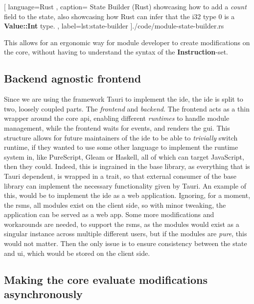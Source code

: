 \begin{center}
  
   [ language=Rust
   , caption={
     State Builder (Rust) showcasing how to add a \textit{count} field to the
     state, also showcasing how Rust can infer that the i32 type $0$ is
     a \textbf{Value::Int} type.
   }
   , label=lst:state-builder
   ]{./code/module-state-builder.rs}
\end{center}

This allows for an ergonomic way for module developer to create modifications on
the core, without having to understand the syntax of the
\textbf{Instruction}-set.


\subsection{Backend agnostic frontend}

Since we are using the framework Tauri to implement the \gls*{ide}, the \gls*{ide}
is split to two, loosely coupled parts. The \textit{frontend} and
\textit{backend}. The frontend acts as a thin wrapper around the core \gls*{api},
enabling different \textit{runtimes} to handle module management, while the
frontend waits for events, and renders the \gls*{gui}. This structure allows for
future maintainers of the \gls*{ide} to be able to \textit{trivially} switch
runtime, if they wanted to use some other language to implement the runtime
system in, like PureScript, Gleam or Haskell, all of which can target
JavaScript, then they could. Indeed, this is ingrained in the base library, as
everything that is Tauri dependent, is wrapped in a trait, so that external
consumer of the base library can implement the necessary functionality given by
Tauri. An example of this, would be to implement the \gls*{ide} as a web
application. Ignoring, for a moment, the \gls*{rsms}, all modules exist on the
client side, so with minor tweaking, the application can be served as a web
app. Some more modifications and workarounds are needed, to support the
\gls*{rsms}, as the modules would exist as a singular instance across multiple
different users, but if the modules are \textit{pure}, this would not matter.
Then the only issue is to ensure consistency between the state and \gls*{ui},
which would be stored on the client side.

\subsection{Making the core evaluate modifications asynchronously}

